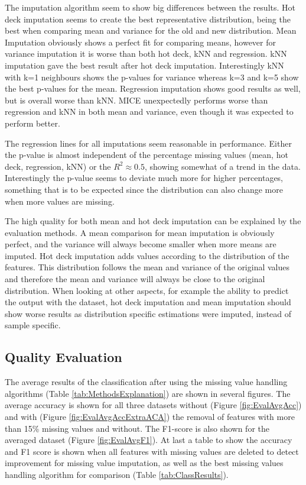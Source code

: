 \documentclass[10pt,a4paper]{report}
\begin{document}
	The imputation algorithm seem to show big differences between the results. Hot deck imputation seems to create the best representative distribution, being the best when comparing mean and variance for the old and new distribution. Mean Imputation obviously shows a perfect fit for comparing means, however for variance imputation it is worse than both hot deck, kNN and regression. kNN imputation gave the best result after hot deck imputation. Interestingly kNN with k=1 neighbours shows the p-values for variance whereas k=3 and k=5 show the best p-values for the mean. Regression imputation shows good results as well, but is overall worse than kNN. MICE unexpectedly performs worse than regression and kNN in both mean and variance, even though it was expected to perform better.
	
	The regression lines for all imputations seem reasonable in performance. Either the p-value is almost independent of the percentage missing values (mean, hot deck, regression, kNN) or the $R^2 \approx 0.5$, showing somewhat of a trend in the data. Interestingly the p-value seems to deviate much more for higher percentages, something that is to be expected since the distribution can also change more when more values are missing.  
	
	The high quality for both mean and hot deck imputation can be explained by the evaluation methods. A mean comparison for mean imputation is obviously perfect, and the variance will always become smaller when more means are imputed. Hot deck imputation adds values according to the distribution of the features. This distribution follows the mean and variance of the original values and therefore the mean and variance will always be close to the original distribution. When looking at other aspects, for example the ability to predict the output with the dataset, hot deck imputation and mean imputation should show worse results as distribution specific estimations were imputed, instead of sample specific.
	
	\subsection{Quality Evaluation}
	\label{MVsubsec:QualityEvaluationResults}
	
	The average results of the classification after using the missing value handling algorithms (Table \ref{tab:MethodsExplanation}) are shown in several figures. The average accuracy is shown for all three datasets without (Figure \ref{fig:EvalAvgAcc}) and with (Figure \ref{fig:EvalAvgAccExtraACA}) the removal of features with more than 15\% missing values  and without. The F1-score is also shown for the averaged dataset (Figure \ref{fig:EvalAvgF1}). At last a table to show the accuracy and F1 score is shown when all features with missing values are deleted to detect improvement for missing value imputation, as well as the best missing values handling algorithm for comparison (Table \ref{tab:ClassResults}).
	
\end{document}
